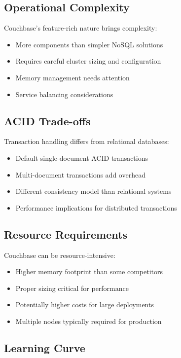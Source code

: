 \subsection{Operational Complexity}

Couchbase's feature-rich nature brings complexity:
\begin{itemize}
  \item More components than simpler NoSQL solutions
  \item Requires careful cluster sizing and configuration
  \item Memory management needs attention
  \item Service balancing considerations
\end{itemize}

\subsection{ACID Trade-offs}

Transaction handling differs from relational databases:
\begin{itemize}
  \item Default single-document ACID transactions
  \item Multi-document transactions add overhead
  \item Different consistency model than relational systems
  \item Performance implications for distributed transactions
\end{itemize}

\subsection{Resource Requirements}

Couchbase can be resource-intensive:
\begin{itemize}
  \item Higher memory footprint than some competitors
  \item Proper sizing critical for performance
  \item Potentially higher costs for large deployments
  \item Multiple nodes typically required for production
\end{itemize}

\subsection{Learning Curve}

